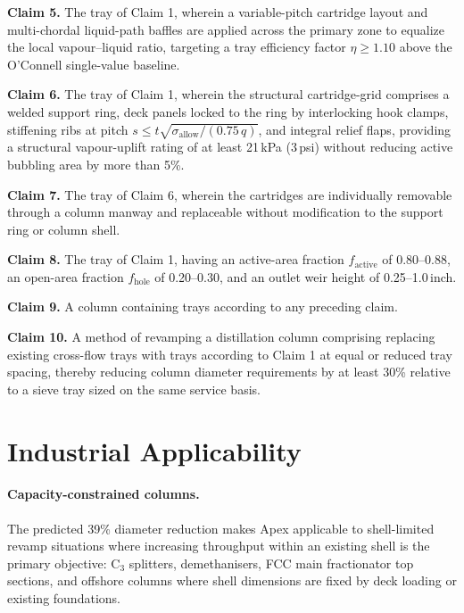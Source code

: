 \documentclass[11pt,letterpaper]{article}
\begin{document}
\textbf{Claim 5.}
The tray of Claim 1, wherein a variable-pitch cartridge layout and
multi-chordal liquid-path baffles are applied across the primary zone to
equalize the local vapour--liquid ratio, targeting a tray efficiency factor
$\eta \geq 1.10$ above the O'Connell single-value baseline.

\textbf{Claim 6.}
The tray of Claim 1, wherein the structural cartridge-grid comprises a
welded support ring, deck panels locked to the ring by interlocking hook
clamps, stiffening ribs at pitch $s \leq t\sqrt{\sigma_{\mathrm{allow}}/(0.75\,q)}$,
and integral relief flaps, providing a structural vapour-uplift rating of at
least 21\,kPa (3\,psi) without reducing active bubbling area by more than 5\%.

\textbf{Claim 7.}
The tray of Claim 6, wherein the cartridges are individually removable
through a column manway and replaceable without modification to the support
ring or column shell.

\textbf{Claim 8.}
The tray of Claim 1, having an active-area fraction $f_{\mathrm{active}}$ of
0.80--0.88, an open-area fraction $f_{\mathrm{hole}}$ of 0.20--0.30, and an
outlet weir height of 0.25--1.0\,inch.

\textbf{Claim 9.}
A column containing trays according to any preceding claim.

\textbf{Claim 10.}
A method of revamping a distillation column comprising replacing existing
cross-flow trays with trays according to Claim 1 at equal or reduced tray
spacing, thereby reducing column diameter requirements by at least 30\%
relative to a sieve tray sized on the same service basis.

\section{Industrial Applicability}
\label{sec:applicability}

\paragraph{Capacity-constrained columns.}
The predicted 39\% diameter reduction makes Apex applicable to
shell-limited revamp situations where increasing throughput within an existing
shell is the primary objective: C$_3$ splitters, demethanisers, FCC main
fractionator top sections, and offshore columns where shell dimensions are
fixed by deck loading or existing foundations.
\end{document}

